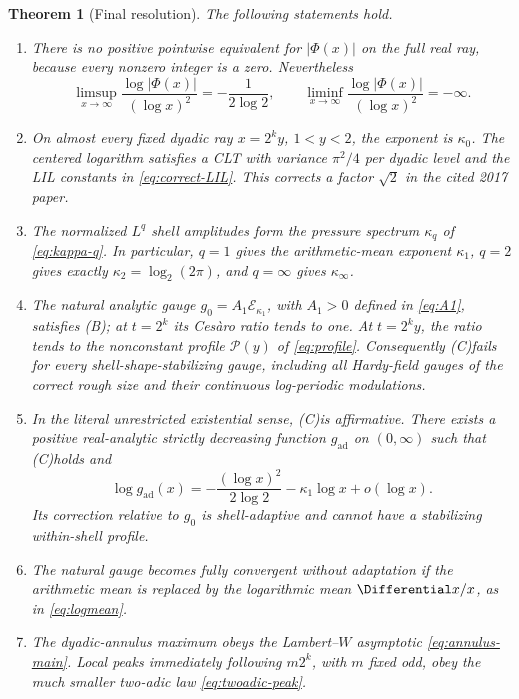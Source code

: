 \documentclass[11pt]{article}
\newtheorem{theorem}{Theorem}[section]
\theoremstyle{definition}
\theoremstyle{remark}
\newcommand{\Ecal}{\mathcal E}
\newcommand{\Ceq}{\textup{(C)}}
\newcommand{\Beq}{\textup{(B)}}
\begin{document}
\begin{theorem}[Final resolution]
\label{thm:final}
The following statements hold.
\begin{enumerate}[label=\textup{(\roman*)}]
\item There is no positive pointwise equivalent for \(|\Phi(x)|\) on the full
real ray, because every nonzero integer is a zero.  Nevertheless
\[
 \limsup_{x\to\infty}\frac{\log|\Phi(x)|}{(\log x)^2}
 =-\frac1{2\log2},
 \qquad
 \liminf_{x\to\infty}\frac{\log|\Phi(x)|}{(\log x)^2}=-\infty.
\]
\item On almost every fixed dyadic ray \(x=2^ky\), \(1<y<2\), the exponent is
\(\kappa_0\).  The centered logarithm satisfies a CLT with variance
\(\pi^2/4\) per dyadic level and the LIL constants in
\eqref{eq:correct-LIL}.  This corrects a factor \(\sqrt2\) in the cited
2017 paper.
\item The normalized \(L^q\) shell amplitudes form the pressure spectrum
\(\kappa_q\) of \eqref{eq:kappa-q}.  In particular, \(q=1\) gives the
arithmetic-mean exponent \(\kappa_1\), \(q=2\) gives exactly
\(\kappa_2=\log_2(2\pi)\), and \(q=\infty\) gives \(\kappa_\infty\).
\item The natural analytic gauge \(g_0=A_1\Ecal_{\kappa_1}\), with \(A_1>0\)
defined in \eqref{eq:A1}, satisfies \Beq; at \(t=2^k\) its
Ces\`aro ratio tends to one.  At \(t=2^ky\), the ratio tends to the
nonconstant profile \(\mathscr P(y)\) of \eqref{eq:profile}.  Consequently
\Ceq fails for every shell-shape-stabilizing gauge, including all
Hardy-field gauges of the correct rough size and their continuous log-periodic
modulations.
\item In the literal unrestricted existential sense, \Ceq is
\emph{affirmative}.  There exists a positive real-analytic strictly decreasing
function \(g_{\mathrm{ad}}\) on \((0,\infty)\) such that \Ceq holds and
\begin{equation}
 \log g_{\mathrm{ad}}(x)
 =-\frac{(\log x)^2}{2\log2}-\kappa_1\log x+o(\log x).
 \label{eq:adaptive-rough}
\end{equation}
Its correction relative to \(g_0\) is shell-adaptive and cannot have a
stabilizing within-shell profile.
\item The natural gauge becomes fully convergent without adaptation if the
arithmetic mean is replaced by the logarithmic mean \(\Differential x/x\), as in
\eqref{eq:logmean}.
\item The dyadic-annulus maximum obeys the Lambert--\(W\) asymptotic
\eqref{eq:annulus-main}.  Local peaks immediately following \(m2^k\), with
\(m\) fixed odd, obey the much smaller two-adic law
\eqref{eq:twoadic-peak}.
\end{enumerate}
\end{theorem}
\end{document}
